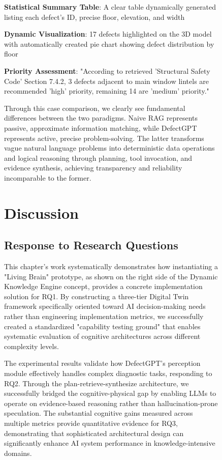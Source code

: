 \begin{figure}[htbp]
\textbf{Statistical Summary Table}: A clear table dynamically generated listing each defect's ID, precise floor, elevation, and width

\textbf{Dynamic Visualization}: 17 defects highlighted on the 3D model with automatically created pie chart showing defect distribution by floor

\textbf{Priority Assessment}: "According to retrieved 'Structural Safety Code' Section 7.4.2, 3 defects adjacent to main window lintels are recommended 'high' priority, remaining 14 are 'medium' priority."

Through this case comparison, we clearly see fundamental differences between the two paradigms. Naive RAG represents passive, approximate information matching, while DefectGPT represents active, precise problem-solving. The latter transforms vague natural language problems into deterministic data operations and logical reasoning through planning, tool invocation, and evidence synthesis, achieving transparency and reliability incomparable to the former.


\section{Discussion}

\subsection{Response to Research Questions}

This chapter's work systematically demonstrates how instantiating a "Living Brain" prototype, as shown on the right side of the Dynamic Knowledge Engine concept, provides a concrete implementation solution for RQ1. By constructing a three-tier Digital Twin framework specifically oriented toward AI decision-making needs rather than engineering implementation metrics, we successfully created a standardized "capability testing ground" that enables systematic evaluation of cognitive architectures across different complexity levels.

The experimental results validate how DefectGPT's perception module effectively handles complex diagnostic tasks, responding to RQ2. Through the plan-retrieve-synthesize architecture, we successfully bridged the cognitive-physical gap by enabling LLMs to operate on evidence-based reasoning rather than hallucination-prone speculation. The substantial cognitive gains measured across multiple metrics provide quantitative evidence for RQ3, demonstrating that sophisticated architectural design can significantly enhance AI system performance in knowledge-intensive domains.


\end{figure}
